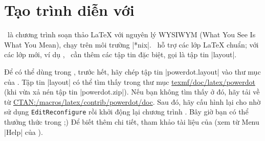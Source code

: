 \section{\texorpdfstring{Tạo trình diễn với \LyX}{Tao trinh dien voi LyX}}%
\label{sec:lyx}

\LyX\ là chương trình soạn thảo \LaTeX{} với nguyên lý WYSIWYM
(What You See Is What You Mean), chạy trên môi trường |*nix|.
\LyX\ hỗ trợ các lớp \LaTeX{} chuẩn; với các lớp mới, ví dụ ,
\LyX\ cần thêm các tập tin đặc biệt, gọi là tập tin |layout|.

Để có thể dùng  trong \LyX, trước hết, hãy chép tập tin |powerdot.layout|
vào thư mục của \LyX. Tập tin |layout| có thể tìm thấy trong thư mục
\url{texmf/doc/latex/powerdot} (khi vừa xả nén tập tin |powerdot.zip|).
Nếu bạn không tìm thấy ở đó, hãy tải về từ \url{CTAN:/macros/latex/contrib/powerdot/doc}.
Sau đó, hãy cấu hình lại cho \LyX{} nhờ sử dụng \texttt{Edit\LyXarrow Reconfigure}
rồi khởi động lại chương trình \LyX. Bây giờ bạn có thể thưởng thức
 trong \LyX ;) Để biết thêm chi tiết, tham khảo tài liệu
của \LyX{} (xem từ Menu |Help| của \LyX).


